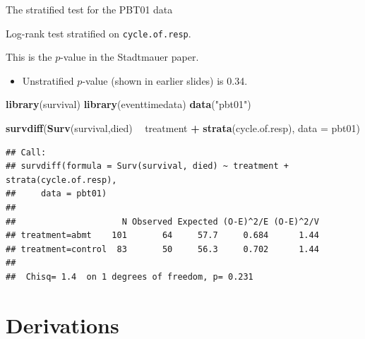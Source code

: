 \documentclass[ignorenonframetext,]{beamer}
\newenvironment{Shaded}{\begin{snugshade}}{\end{snugshade}}
\newcommand{\DataTypeTok}[1]{\textcolor[rgb]{0.13,0.29,0.53}{#1}}
\newcommand{\KeywordTok}[1]{\textcolor[rgb]{0.13,0.29,0.53}{\textbf{#1}}}
\newcommand{\NormalTok}[1]{#1}
\newcommand{\OperatorTok}[1]{\textcolor[rgb]{0.81,0.36,0.00}{\textbf{#1}}}
\newcommand{\StringTok}[1]{\textcolor[rgb]{0.31,0.60,0.02}{#1}}
\providecommand{\tightlist}{%
  \setlength{\itemsep}{0pt}\setlength{\parskip}{0pt}}
\begin{document}
\begin{frame}[fragile]{%
\protect\hypertarget{the-stratified-test-for-the-pbt01-data}{%
The stratified test for the PBT01 data}}

Log-rank test stratified on \texttt{cycle.of.resp}.

This is the \(p\)-value in the Stadtmauer paper.

\begin{itemize}
\tightlist
\item
  Unstratified \(p\)-value (shown in earlier slides) is 0.34.
\end{itemize}

\scriptsize

\begin{Shaded}
\begin{Highlighting}[]
\KeywordTok{library}\NormalTok{(survival)}
\KeywordTok{library}\NormalTok{(eventtimedata)}
\KeywordTok{data}\NormalTok{(}\StringTok{"pbt01"}\NormalTok{)}

\KeywordTok{survdiff}\NormalTok{(}\KeywordTok{Surv}\NormalTok{(survival,died) }\OperatorTok{~}\StringTok{ }\NormalTok{treatment }\OperatorTok{+}\StringTok{ }\KeywordTok{strata}\NormalTok{(cycle.of.resp),}
              \DataTypeTok{data =}\NormalTok{ pbt01)}
\end{Highlighting}
\end{Shaded}

\begin{verbatim}
## Call:
## survdiff(formula = Surv(survival, died) ~ treatment + strata(cycle.of.resp), 
##     data = pbt01)
## 
##                     N Observed Expected (O-E)^2/E (O-E)^2/V
## treatment=abmt    101       64     57.7     0.684      1.44
## treatment=control  83       50     56.3     0.702      1.44
## 
##  Chisq= 1.4  on 1 degrees of freedom, p= 0.231
\end{verbatim}

\end{frame}

\hypertarget{derivations}{%
\section{Derivations}\label{derivations}}
\end{document}
